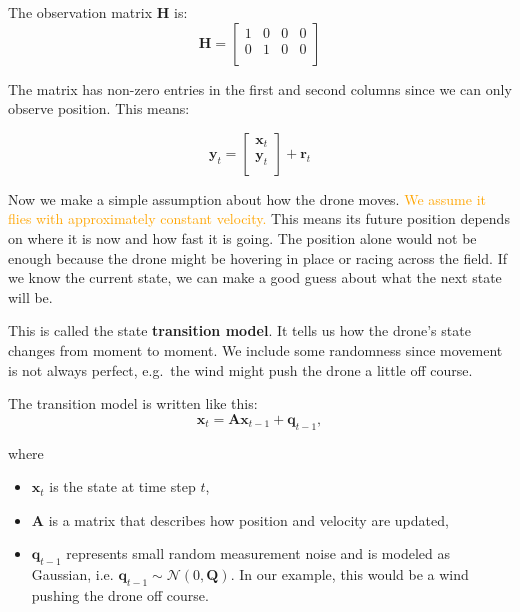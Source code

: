 \begin{example}
The observation matrix \textbf{H} is: 
\[\mathbf{H} = \begin{bmatrix}
   1 & 0 & 0 & 0\\
   0 & 1 & 0 & 0\\   
\end{bmatrix}\]

The matrix has non-zero entries in the first and second columns since we can only observe position. This means: 

\[\mathbf{y}_t = \begin{bmatrix}
   \textbf{x}_t \\
   \textbf{y}_t \\ 
\end{bmatrix} + \textbf{r}_t\]


\medskip 
Now we make a simple assumption about how the drone moves. %
\textcolor{orange}{We assume it flies with approximately constant velocity.} This means its future position depends on where it is now and how fast it is going. The position alone would not be enough because the drone might be hovering in place or racing across the field. If we know the current state, we can make a good guess about what the next state will be. 

This is called the state \textbf{transition model}. It tells us how the drone's state changes from moment to moment. We include some randomness since movement is not always perfect, e.g.~the wind might push the drone a little off course. 

The transition model is written like this: 
\begin{equation}\label{eq: transition model}
\textbf{x}_t = \textbf{A}\textbf{x}_{t-1}+\textbf{q}_{t-1},   
\end{equation}

where 
\begin{itemize}
    \item $\textbf{x}_t$ is the state at time step $t$,
    \item $\textbf{A}$ is a matrix that describes how position and velocity are updated, 
    \item $\mathbf{q}_{t-1}$ represents small random measurement noise and is modeled as Gaussian, i.e. $\mathbf{q}_{t-1} \sim \mathcal{N}(0, \mathbf{Q})$. In our example, this would be a wind pushing the drone off course. 
\end{itemize}


\end{example}
